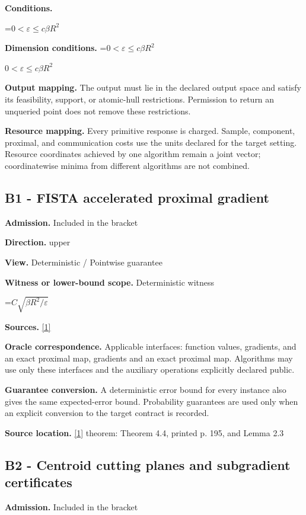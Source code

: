 \documentclass[10pt,a4paper]{article}
\newcommand{\AtlasMath}[1]{\par\begingroup\centering\setbox0=\hbox{$\displaystyle #1$}\ifdim\wd0>1.4\linewidth\typeout{ATLAS WIDE FORMULA: \the\wd0}\fi\ifdim\wd0>\linewidth\resizebox{\linewidth}{!}{\box0}\else\box0\fi\par\endgroup}
\newcommand{\AtlasInlineMath}[1]{\begingroup\setbox0=\hbox{$#1$}\ifdim\wd0>.4\linewidth\endgroup\AtlasMath{#1}\else\endgroup$#1$\fi}
\begin{document}
\textbf{Conditions.} 
\AtlasMath{0<\varepsilon\le c\beta R^2}


\textbf{Dimension conditions.} \AtlasInlineMath{0<\varepsilon\le c\beta R^2}

\textbf{Output mapping.} The output must lie in the declared output space and satisfy its feasibility, support, or atomic-hull restrictions. Permission to return an unqueried point does not remove these restrictions.

\textbf{Resource mapping.} Every primitive response is charged. Sample, component, proximal, and communication costs use the units declared for the target setting. Resource coordinates achieved by one algorithm remain a joint vector; coordinatewise minima from different algorithms are not combined.

\subsection{B1 - FISTA accelerated proximal gradient}
\textbf{Admission.} Included in the bracket

\textbf{Direction.} upper

\textbf{View.} Deterministic / Pointwise guarantee

\textbf{Witness or lower-bound scope.} Deterministic witness

\AtlasMath{C\sqrt{\beta R^2/\varepsilon}}
\textbf{Sources.} \href{https://www.tau.ac.il/~becka/FISTA.pdf}{[1]}

\textbf{Oracle correspondence.} Applicable interfaces: function values, gradients, and an exact proximal map, gradients and an exact proximal map. Algorithms may use only these interfaces and the auxiliary operations explicitly declared public.

\textbf{Guarantee conversion.} A deterministic error bound for every instance also gives the same expected-error bound. Probability guarantees are used only when an explicit conversion to the target contract is recorded.

\textbf{Source location.} \href{https://www.tau.ac.il/~becka/FISTA.pdf}{[1]} theorem: Theorem 4.4, printed p. 195, and Lemma 2.3

\subsection{B2 - Centroid cutting planes and subgradient certificates}
\textbf{Admission.} Included in the bracket
\end{document}
